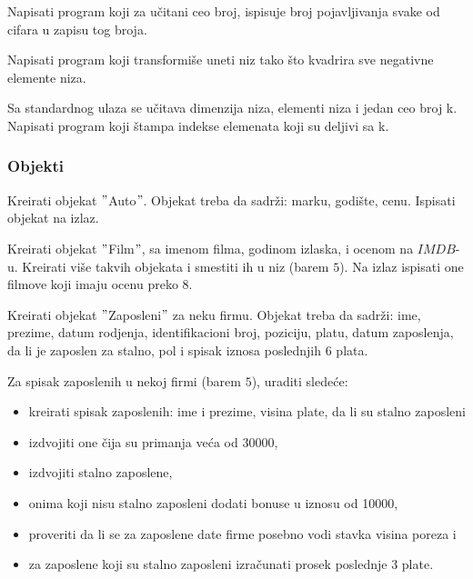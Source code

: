 \begin{primer}
Napisati program koji za učitani ceo broj, ispisuje broj
pojavljivanja svake od cifara u zapisu tog broja.
\end{primer}


\begin{primer}
Napisati program koji transformiše uneti niz tako što
kvadrira sve negativne elemente niza. 
\end{primer}

\begin{primer}
Sa standardnog ulaza se učitava dimenzija niza, elementi
niza i jedan ceo broj k. Napisati program koji štampa indekse elemenata koji su
deljivi sa k.
\end{primer}

\subsubsection{Objekti}
\begin{primer}
Kreirati objekat $"$Auto$"$. Objekat treba da sadrži: marku, godište, cenu.
Ispisati objekat na izlaz.
\end{primer}

\begin{primer}
Kreirati objekat $"$Film$"$, sa imenom filma, godinom izlaska, i ocenom na $IMDB$-u. Kreirati više takvih objekata i smestiti ih u niz (barem $5$). Na izlaz ispisati one filmove koji imaju ocenu preko $8$.  
\end{primer}

\begin{primer}
Kreirati objekat $"$Zaposleni$"$ za neku firmu. Objekat treba da sadrži: ime, prezime, datum rodjenja, identifikacioni broj, poziciju, platu, datum zaposlenja, da li je zaposlen za stalno, pol i spisak iznosa poslednjih $6$ plata.
\end{primer}

\begin{primer}
Za spisak zaposlenih u nekoj firmi (barem $5$), uraditi sledeće:
\begin{itemize}
	\item kreirati spisak zaposlenih: ime i prezime, visina plate, da li su stalno zaposleni
	\item izdvojiti one čija su primanja veća od 30000,
	\item izdvojiti stalno zaposlene,
	\item onima koji nisu stalno zaposleni dodati bonuse u iznosu od 10000,	
	\item proveriti da li se za zaposlene date firme posebno vodi stavka visina poreza i
	\item za zaposlene koji su stalno zaposleni izračunati prosek poslednje 3 plate.
\end{itemize}

\end{primer}

